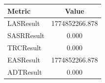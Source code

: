 \begin{table}[]
\centering
\begin{tabular}{|l|c|}
\hline
Metric & Value \\
\hline
LASResult & 1774852266.878 \\
SASRResult & 0.000 \\
TRCResult & 0.000 \\
EASResult & 1774852266.878 \\
ADTResult & 0.000 \\
\hline
\end{tabular}
\end{table}